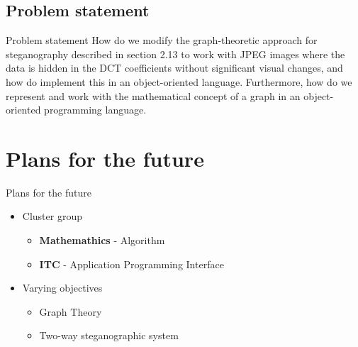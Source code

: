 
	
		




\subsection{Problem statement}
\begin{frame}{Problem statement}{}
How do we modify the graph-theoretic approach
for steganography described in section 2.13 to work
with JPEG images where the data is hidden in the
DCT coefficients without significant visual changes,
and how do implement this in an object-oriented
language. Furthermore, how do we represent and
work with the mathematical concept of a graph in
an object-oriented programming language.
\end{frame}



\section{Plans for the future}
\begin{frame}{Plans for the future}{}
	\begin{itemize}
		\item Cluster group
        \begin{itemize}
            \item \textbf{Mathemathics} - Algorithm 
            \item \textbf{ITC} - Application Programming Interface
        \end{itemize}
		\item Varying objectives
        \begin{itemize}
            \item Graph Theory 
            \item Two-way steganographic system
        \end{itemize}
	\end{itemize}
\end{frame}



